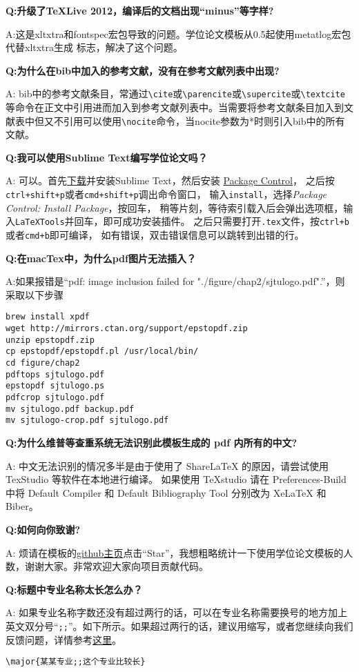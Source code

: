 {\bfseries{}Q:升级了TeXLive 2012，编译后的文档出现“minus”等字样?}

A:这是xltxtra和fontspec宏包导致的问题。学位论文模板从0.5起使用metatlog宏包代替xltxtra生成 \XeTeX 标志，解决了这个问题。

{\bfseries{}Q:为什么在bib中加入的参考文献，没有在参考文献列表中出现?}

A: bib中的参考文献条目，常通过\verb+\cite+或\verb+\parencite+或\verb+\supercite+或\verb+\textcite+等命令在正文中引用进而加入到参考文献列表中。当需要将参考文献条目加入到文献表中但又不引用可以使用\verb+\nocite+命令，当nocite参数为*时则引入bib中的所有文献。

{\bfseries{}Q:我可以使用Sublime Text编写学位论文吗？}

A: 可以。首先\href{https://www.sublimetext.com/}{下载}并安装Sublime Text，然后安装
\href{https://packagecontrol.io/installation}{Package Control}，
之后按\verb|ctrl+shift+p|或者\verb|cmd+shift+p|调出命令窗口，
输入\verb|install|，选择\textit{Package Control: Install Package}，按回车，
稍等片刻，等待索引载入后会弹出选项框，输入\verb|LaTeXTools|并回车，即可成功安装插件。
之后只需要打开\verb|.tex|文件，按\verb|ctrl+b|或者\verb|cmd+b|即可编译，
如有错误，双击错误信息可以跳转到出错的行。

{\bfseries{}Q:在macTex中，为什么pdf图片无法插入？}

A:如果报错是“pdf: image inclusion failed for "./figure/chap2/sjtulogo.pdf".”，则采取以下步骤

\begin{lstlisting}[basicstyle=\small\ttfamily, caption={编译模板}, numbers=none]
brew install xpdf
wget http://mirrors.ctan.org/support/epstopdf.zip
unzip epstopdf.zip
cp epstopdf/epstopdf.pl /usr/local/bin/
cd figure/chap2
pdftops sjtulogo.pdf
epstopdf sjtulogo.ps
pdfcrop sjtulogo.pdf
mv sjtulogo.pdf backup.pdf
mv sjtulogo-crop.pdf sjtulogo.pdf
\end{lstlisting}

{\bfseries{}Q:为什么维普等查重系统无法识别此模板生成的 pdf 内所有的中文?}

A: 中文无法识别的情况多半是由于使用了 ShareLaTeX 的原因，请尝试使用 TexStudio 等软件在本地进行编译。
如果使用 TeXstudio 请在 Preferences-Build 中将 Default Compiler 和 Default Bibliography Tool 分别改为 XeLaTeX 和 Biber。

{\bfseries{}Q:如何向你致谢?}

A: 烦请在模板的\href{https://github.com/sjtug/SJTUThesis}{github主页}点击“Star”，我想粗略统计一下使用学位论文模板的人数，谢谢大家。非常欢迎大家向项目贡献代码。

{\bfseries{}Q:标题中专业名称太长怎么办？}

A: 如果专业名称字数还没有超过两行的话，可以在专业名称需要换号的地方加上英文双分号“\verb|;;|”。如下所示。如果超过两行的话，建议用缩写，或者您继续向我们反馈问题，详情参考\href{https://github.com/sjtug/SJTUThesis/pull/369}{这里}。

\begin{lstlisting}[language={Tex}, caption={标题专业名称太长怎么办}]
\major{某某专业;;这个专业比较长}
\end{lstlisting}

